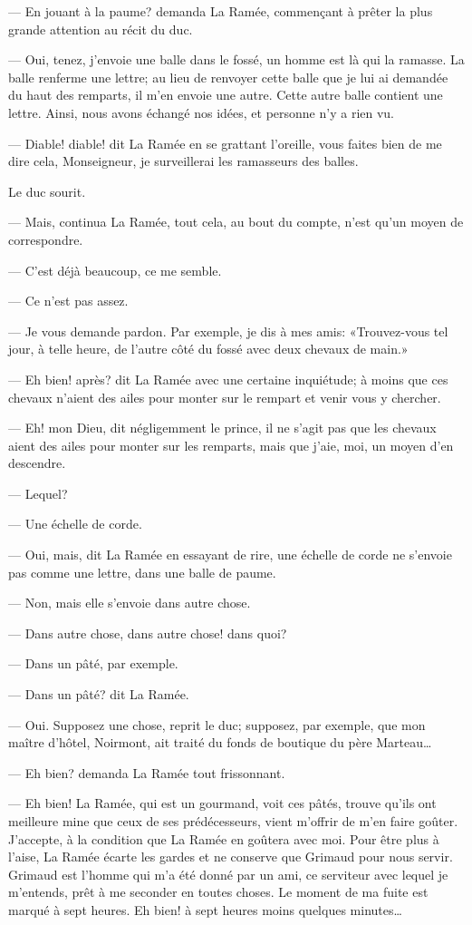 — En jouant à la paume? demanda La Ramée, commençant à prêter la plus grande attention au récit du duc.

— Oui, tenez, j'envoie une balle dans le fossé, un homme est là qui la ramasse. La balle renferme une lettre; au lieu de renvoyer cette balle que je lui ai demandée du haut des remparts, il m'en envoie une autre. Cette autre balle contient une lettre. Ainsi, nous avons échangé nos idées, et personne n'y a rien vu.

— Diable! diable! dit La Ramée en se grattant l'oreille, vous faites bien de me dire cela, Monseigneur, je surveillerai les ramasseurs des balles.

Le duc sourit.

— Mais, continua La Ramée, tout cela, au bout du compte, n'est qu'un moyen de correspondre.

— C'est déjà beaucoup, ce me semble.

— Ce n'est pas assez.

— Je vous demande pardon. Par exemple, je dis à mes amis: «Trouvez-vous tel jour, à telle heure, de l'autre côté du fossé avec deux chevaux de main.»

— Eh bien! après? dit La Ramée avec une certaine inquiétude; à moins que ces chevaux n'aient des ailes pour monter sur le rempart et venir vous y chercher.

— Eh! mon Dieu, dit négligemment le prince, il ne s'agit pas que les chevaux aient des ailes pour monter sur les remparts, mais que j'aie, moi, un moyen d'en descendre.

— Lequel?

— Une échelle de corde.

— Oui, mais, dit La Ramée en essayant de rire, une échelle de corde ne s'envoie pas comme une lettre, dans une balle de paume.

— Non, mais elle s'envoie dans autre chose.

— Dans autre chose, dans autre chose! dans quoi?

— Dans un pâté, par exemple.

— Dans un pâté? dit La Ramée.

— Oui. Supposez une chose, reprit le duc; supposez, par exemple, que mon maître d'hôtel, Noirmont, ait traité du fonds de boutique du père Marteau\dots

— Eh bien? demanda La Ramée tout frissonnant.

— Eh bien! La Ramée, qui est un gourmand, voit ces pâtés, trouve qu'ils ont meilleure mine que ceux de ses prédécesseurs, vient m'offrir de m'en faire goûter. J'accepte, à la condition que La Ramée en goûtera avec moi. Pour être plus à l'aise, La Ramée écarte les gardes et ne conserve que Grimaud pour nous servir. Grimaud est l'homme qui m'a été donné par un ami, ce serviteur avec lequel je m'entends, prêt à me seconder en toutes choses. Le moment de ma fuite est marqué à sept heures. Eh bien! à sept heures moins quelques minutes\dots


